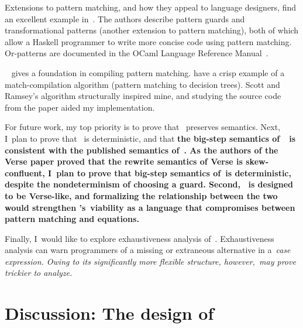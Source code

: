 \documentclass[manuscript,screen 12pt, nonacm]{acmart}
\begin{document}
    Extensions to pattern matching, and how they appeal to language designers,
    find an excellent example in~\citet{guardproposal}. The authors describe
    pattern guards and transformational patterns (another extension to pattern
    matching), both of which allow a Haskell programmer to write more concise
    code using pattern matching. Or-patterns are documented in the OCaml
    Language Reference Manual~\citep{ocaml}.
    
    \citet{augustsson1985compiling}~ gives a foundation in compiling pattern
    matching. \citet{scottramsey} have a crisp example of a match-compilation
    algorithm (pattern matching to decision trees). Scott and Ramsey's algorithm
    structurally inspired mine, and studying the source code from the paper
    aided my implementation. 

    For future work, my top priority is to prove that \DTran\ preserves
    semantics.
    Next, I~plan to prove that
    \VMinus~is deterministic, and that \bf{the big-step semantics of~\VMinus~is
    consistent with the published semantics of~\VC.} As the authors of the Verse
    paper proved that the rewrite semantics of Verse is skew-confluent, I~plan
    to prove that big-step semantics of~\VMinus is deterministic, despite the
    nondeterminism of choosing a guard. Second, \VMinus~is designed to be
    Verse-like, and formalizing the relationship between the two would
    strengthen \VMinus's~viability as a language that compromises between
    pattern matching and equations. 

    Finally, I~would like to explore
    exhaustiveness analysis of~\VMinus.
    Exhaustiveness analysis
    can warn programmers of a missing or extraneous alternative in a~\it{case} expression.
    Owing to its significantly more flexible structure,
    however,~\iffibf may prove trickier to analyze.
    
    
    \section{Discussion: The design of \VMinus}        
    \label{futurework}
    
\end{document}
